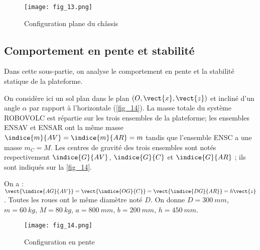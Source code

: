 \begin{figure}[H]
\centering
\texttt{[image: fig\_13.png]}
\caption{Configuration plane du châssis\label{fig_13}}
\end{figure}

\subsection{Comportement en pente et stabilité}
\begin{obj}
Dans cette sous-partie, on analyse le comportement en pente et la stabilité statique de la
plateforme.
\end{obj}


On considère ici un sol plan dans le plan $\left(O,\vect{x},\vect{z}\right)$ et incliné d'un angle $\alpha$ par rapport à
l'horizontale (\autoref{fig_14}). La masse totale du système ROBOVOLC est répartie sur les trois
ensembles de la plateforme; les ensembles ENSAV et ENSAR ont la même masse
$\indice{m}{AV}=\indice{m}{AR}=m$ tandis que l'ensemble ENSC a une masse $m_C=M$. Les centres de gravité des
trois ensembles sont notés respectivement $\indice{G}{AV}$, $\indice{G}{C}$ et $\indice{G}{AR}$ ; ils sont indiqués sur la \autoref{fig_14}.

On a : $\vect{\indice{AG}{AV}}=\vect{\indice{OG}{C}}=\vect{\indice{DG}{AR}}=h\vect{z}$. 
Toutes les roues ont le même diamètre noté $D$.
On donne $D =\SI{300}{mm}$, $m =\SI{60}{kg}$, $M =\SI{80}{kg}$, $a =\SI{800}{mm}$, $b =\SI{200}{mm}$, $h =\SI{450}{mm}$.


\begin{figure}[H]
\centering
\texttt{[image: fig\_14.png]}
\caption{Configuration en pente \label{fig_14}}
\end{figure}

\ifprof
\begin{corrige}
\end{corrige}
\else
\fi

\ifprof
\begin{corrige}
\end{corrige}
\else
\fi

